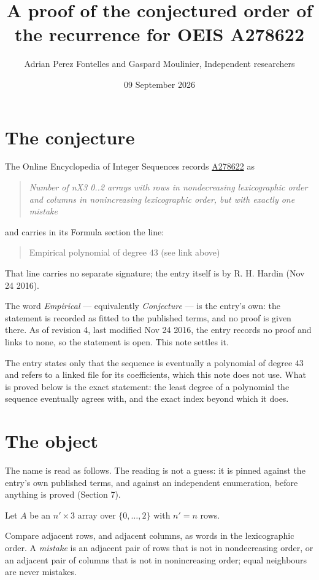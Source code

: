 \documentclass[11pt]{article}
\title{A proof of the conjectured order of the recurrence for OEIS A278622}
\author{Adrian Perez Fontelles and Gaspard Moulinier, Independent researchers}
\date{09 September 2026}
\theoremstyle{definition}
\begin{document}
\maketitle
\section{The conjecture}

The Online Encyclopedia of Integer Sequences records \href{https://oeis.org/A278622}{A278622} as

\begin{quote}\itshape Number of nX3 0..2 arrays with rows in nondecreasing lexicographic order and columns in nonincreasing lexicographic order, but with exactly one mistake\end{quote}

and carries in its Formula section the line:

\begin{quote}\ttfamily Empirical polynomial of degree 43 (see link above)\end{quote}

That line carries no separate signature; the entry itself is by R. H. Hardin (Nov 24 2016).

The word {\itshape Empirical} --- equivalently {\itshape Conjecture} --- is the entry's own: the statement is recorded as fitted to the published terms, and no proof is given there. As of revision 4, last modified Nov 24 2016, the entry records no proof and links to none, so the statement is open. This note settles it.

The entry states only that the sequence is eventually a polynomial of degree $43$ and refers to a linked file for its coefficients, which this note does not use. What is proved below is the exact statement: the least degree of a polynomial the sequence eventually agrees with, and the exact index beyond which it does.

\section{The object}

The name is read as follows. The reading is not a guess: it is pinned against the entry's own published terms, and against an independent enumeration, before anything is proved (Section 7).

Let $A$ be an $n' \times 3$ array over $\{0,\dots,2\}$ with $n' = n$ rows.

Compare adjacent rows, and adjacent columns, as words in the lexicographic order. A {\itshape mistake} is an adjacent pair of rows that is not in nondecreasing order, or an adjacent pair of columns that is not in nonincreasing order; equal neighbours are never mistakes.
\end{document}
